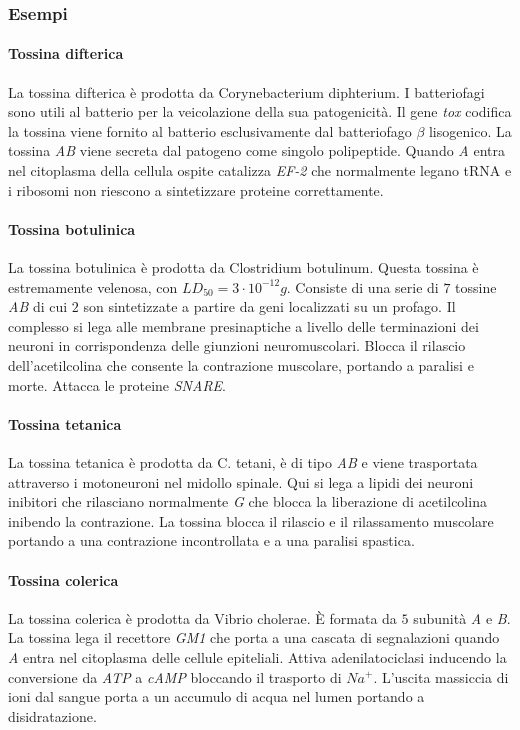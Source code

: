 		\subsubsection{Esempi}

			\paragraph{Tossina difterica}
			La tossina difterica \`e prodotta da Corynebacterium diphterium.
			I batteriofagi sono utili al batterio per la veicolazione della sua patogenicit\`a.
			Il gene \emph{tox} codifica la tossina viene fornito al batterio esclusivamente dal batteriofago $\beta$ lisogenico.
			La tossina \emph{AB} viene secreta dal patogeno come singolo polipeptide.
			Quando \emph{A} entra nel citoplasma della cellula ospite catalizza \emph{EF-2} che normalmente legano tRNA e i ribosomi non riescono a sintetizzare proteine correttamente.

			\paragraph{Tossina botulinica}
			La tossina botulinica \`e prodotta da Clostridium botulinum.
			Questa tossina \`e estremamente velenosa, con $LD_{50} = 3\cdot 10^{-12}\si{g}$.
			Consiste di una serie di $7$ tossine \emph{AB} di cui $2$ son sintetizzate a partire da geni localizzati su un profago.
			Il complesso si lega alle membrane presinaptiche a livello delle terminazioni dei neuroni in corrispondenza delle giunzioni neuromuscolari.
			Blocca il rilascio dell'acetilcolina che consente la contrazione muscolare, portando a paralisi e morte.
			Attacca le proteine \emph{SNARE}.

			\paragraph{Tossina tetanica}
			La tossina tetanica \`e prodotta da C. tetani, \`e di tipo \emph{AB} e viene trasportata attraverso i motoneuroni nel midollo spinale.
			Qui si lega a lipidi dei neuroni inibitori che rilasciano normalmente \emph{G} che blocca la liberazione di acetilcolina inibendo la contrazione.
			La tossina blocca il rilascio e il rilassamento muscolare portando a una contrazione incontrollata e a una paralisi spastica.

			\paragraph{Tossina colerica}
			La tossina colerica \`e prodotta da Vibrio cholerae.
			\`E formata da $5$ subunit\`a \emph{A} e \emph{B}.
			La tossina lega il recettore \emph{GM1} che porta a una cascata di segnalazioni quando \emph{A} entra nel citoplasma delle cellule epiteliali.
			Attiva adenilatociclasi inducendo la conversione da \emph{ATP} a \emph{cAMP} bloccando il trasporto di \emph{$Na^+$}.
			L'uscita massiccia di ioni dal sangue porta a un accumulo di acqua nel lumen portando a disidratazione.


